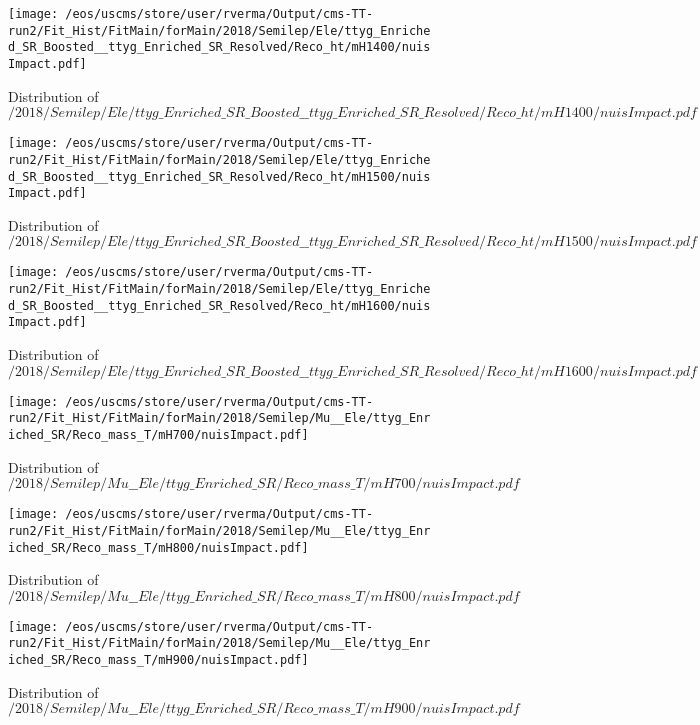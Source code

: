 \begin{figure}
\centering
\texttt{[image: /eos/uscms/store/user/rverma/Output/cms-TT-run2/Fit\_Hist/FitMain/forMain/2018/Semilep/Ele/ttyg\_Enriched\_SR\_Boosted\_\_ttyg\_Enriched\_SR\_Resolved/Reco\_ht/mH1400/nuisImpact.pdf]}
\caption{Distribution of $/2018/Semilep/Ele/ttyg\_Enriched\_SR\_Boosted\_\_ttyg\_Enriched\_SR\_Resolved/Reco\_ht/mH1400/nuisImpact.pdf$}
\end{figure}

\begin{figure}
\centering
\texttt{[image: /eos/uscms/store/user/rverma/Output/cms-TT-run2/Fit\_Hist/FitMain/forMain/2018/Semilep/Ele/ttyg\_Enriched\_SR\_Boosted\_\_ttyg\_Enriched\_SR\_Resolved/Reco\_ht/mH1500/nuisImpact.pdf]}
\caption{Distribution of $/2018/Semilep/Ele/ttyg\_Enriched\_SR\_Boosted\_\_ttyg\_Enriched\_SR\_Resolved/Reco\_ht/mH1500/nuisImpact.pdf$}
\end{figure}

\begin{figure}
\centering
\texttt{[image: /eos/uscms/store/user/rverma/Output/cms-TT-run2/Fit\_Hist/FitMain/forMain/2018/Semilep/Ele/ttyg\_Enriched\_SR\_Boosted\_\_ttyg\_Enriched\_SR\_Resolved/Reco\_ht/mH1600/nuisImpact.pdf]}
\caption{Distribution of $/2018/Semilep/Ele/ttyg\_Enriched\_SR\_Boosted\_\_ttyg\_Enriched\_SR\_Resolved/Reco\_ht/mH1600/nuisImpact.pdf$}
\end{figure}

\begin{figure}
\centering
\texttt{[image: /eos/uscms/store/user/rverma/Output/cms-TT-run2/Fit\_Hist/FitMain/forMain/2018/Semilep/Mu\_\_Ele/ttyg\_Enriched\_SR/Reco\_mass\_T/mH700/nuisImpact.pdf]}
\caption{Distribution of $/2018/Semilep/Mu\_\_Ele/ttyg\_Enriched\_SR/Reco\_mass\_T/mH700/nuisImpact.pdf$}
\end{figure}

\begin{figure}
\centering
\texttt{[image: /eos/uscms/store/user/rverma/Output/cms-TT-run2/Fit\_Hist/FitMain/forMain/2018/Semilep/Mu\_\_Ele/ttyg\_Enriched\_SR/Reco\_mass\_T/mH800/nuisImpact.pdf]}
\caption{Distribution of $/2018/Semilep/Mu\_\_Ele/ttyg\_Enriched\_SR/Reco\_mass\_T/mH800/nuisImpact.pdf$}
\end{figure}

\begin{figure}
\centering
\texttt{[image: /eos/uscms/store/user/rverma/Output/cms-TT-run2/Fit\_Hist/FitMain/forMain/2018/Semilep/Mu\_\_Ele/ttyg\_Enriched\_SR/Reco\_mass\_T/mH900/nuisImpact.pdf]}
\caption{Distribution of $/2018/Semilep/Mu\_\_Ele/ttyg\_Enriched\_SR/Reco\_mass\_T/mH900/nuisImpact.pdf$}
\end{figure}

